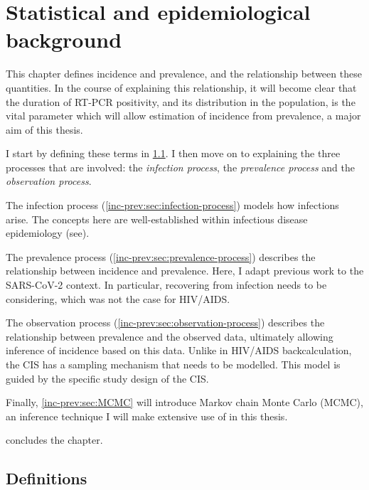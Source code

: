 \documentclass[thesis.tex]{subfiles}
\begin{document}
\ifSubfilesClassLoaded{
  \setcounter{chapter}{2}
}

\chapter{Statistical and epidemiological background} \label{inc-prev}


This chapter defines incidence and prevalence, and the relationship between these quantities.
In the course of explaining this relationship, it will become clear that the duration of RT-PCR positivity, and its distribution in the population, is the vital parameter which will allow estimation of incidence from prevalence, a major aim of this thesis.

I start by defining these terms in \cref{inc-prev:sec:definitions}.
I then move on to explaining the three processes that are involved: the \emph{infection process}, the \emph{prevalence process} and the \emph{observation process}.

The infection process (\cref{inc-prev:sec:infection-process}) models how infections arise.
The concepts here are well-established within infectious disease epidemiology (see).

The prevalence process (\cref{inc-prev:sec:prevalence-process}) describes the relationship between incidence and prevalence.
Here, I adapt previous work to the SARS-CoV-2 context.
In particular, recovering from infection needs to be considering, which was not the case for HIV/AIDS.

The observation process (\cref{inc-prev:sec:observation-process}) describes the relationship between prevalence and the observed data, ultimately allowing inference of incidence based on this data.
Unlike in HIV/AIDS backcalculation, the CIS has a sampling mechanism that needs to be modelled.
This model is guided by the specific study design of the CIS.

Finally, \cref{inc-prev:sec:MCMC} will introduce Markov chain Monte Carlo (MCMC), an inference technique I will make extensive use of in this thesis.

 concludes the chapter.

\section{Definitions} \label{inc-prev:sec:definitions}
\end{document}
